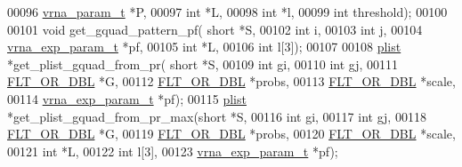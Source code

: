 \begin{DoxyCode}
00096                               \hyperlink{group__energy__parameters_structvrna__param__s}{vrna\_param\_t} *P,
00097                               \textcolor{keywordtype}{int} *L,
00098                               \textcolor{keywordtype}{int} *l,
00099                               \textcolor{keywordtype}{int} threshold);
00100 
00101 \textcolor{keywordtype}{void}        get\_gquad\_pattern\_pf( \textcolor{keywordtype}{short} *S,
00102                                   \textcolor{keywordtype}{int} i,
00103                                   \textcolor{keywordtype}{int} j,
00104                                   \hyperlink{group__energy__parameters_structvrna__exp__param__s}{vrna\_exp\_param\_t} *pf,
00105                                   \textcolor{keywordtype}{int} *L,
00106                                   \textcolor{keywordtype}{int} l[3]);
00107 
00108 \hyperlink{group__data__structures_structvrna__plist__s}{plist}       *get\_plist\_gquad\_from\_pr( \textcolor{keywordtype}{short} *S,
00109                                       \textcolor{keywordtype}{int} gi,
00110                                       \textcolor{keywordtype}{int} gj,
00111                                       \hyperlink{group__data__structures_ga31125aeace516926bf7f251f759b6126}{FLT\_OR\_DBL} *G,
00112                                       \hyperlink{group__data__structures_ga31125aeace516926bf7f251f759b6126}{FLT\_OR\_DBL} *probs,
00113                                       \hyperlink{group__data__structures_ga31125aeace516926bf7f251f759b6126}{FLT\_OR\_DBL} *scale,
00114                                       \hyperlink{group__energy__parameters_structvrna__exp__param__s}{vrna\_exp\_param\_t} *pf);
00115 \hyperlink{group__data__structures_structvrna__plist__s}{plist}       *get\_plist\_gquad\_from\_pr\_max(\textcolor{keywordtype}{short} *S,
00116                                       \textcolor{keywordtype}{int} gi,
00117                                       \textcolor{keywordtype}{int} gj,
00118                                       \hyperlink{group__data__structures_ga31125aeace516926bf7f251f759b6126}{FLT\_OR\_DBL} *G,
00119                                       \hyperlink{group__data__structures_ga31125aeace516926bf7f251f759b6126}{FLT\_OR\_DBL} *probs,
00120                                       \hyperlink{group__data__structures_ga31125aeace516926bf7f251f759b6126}{FLT\_OR\_DBL} *scale,
00121                                       \textcolor{keywordtype}{int} *L,
00122                                       \textcolor{keywordtype}{int} l[3],
00123                                       \hyperlink{group__energy__parameters_structvrna__exp__param__s}{vrna\_exp\_param\_t} *pf);

\end{DoxyCode}
